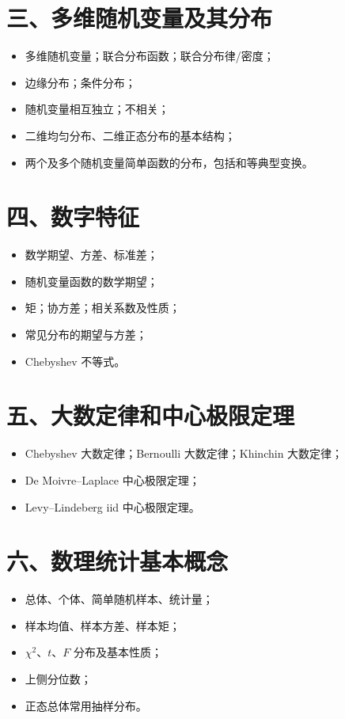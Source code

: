 \documentclass[11pt,a4paper,openany]{ctexbook}
\begin{document}
\section*{三、多维随机变量及其分布}
\begin{itemize}
\item 多维随机变量；联合分布函数；联合分布律/密度；
\item 边缘分布；条件分布；
\item 随机变量相互独立；不相关；
\item 二维均匀分布、二维正态分布的基本结构；
\item 两个及多个随机变量简单函数的分布，包括和等典型变换。
\end{itemize}

\section*{四、数字特征}
\begin{itemize}
\item 数学期望、方差、标准差；
\item 随机变量函数的数学期望；
\item 矩；协方差；相关系数及性质；
\item 常见分布的期望与方差；
\item Chebyshev 不等式。
\end{itemize}

\section*{五、大数定律和中心极限定理}
\begin{itemize}
\item Chebyshev 大数定律；Bernoulli 大数定律；Khinchin 大数定律；
\item De Moivre--Laplace 中心极限定理；
\item Levy--Lindeberg iid 中心极限定理。
\end{itemize}

\section*{六、数理统计基本概念}
\begin{itemize}
\item 总体、个体、简单随机样本、统计量；
\item 样本均值、样本方差、样本矩；
\item $\chi^2$、$t$、$F$ 分布及基本性质；
\item 上侧分位数；
\item 正态总体常用抽样分布。
\end{itemize}
\end{document}
